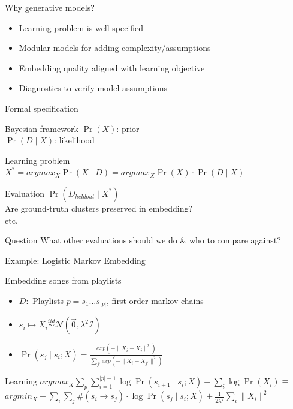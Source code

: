 \documentclass{beamer}
\begin{document}
\begin{frame}{Why generative models?}
  \begin{itemize}
    \item Learning problem is well specified
    \item Modular models for adding complexity/assumptions
    \item Embedding quality aligned with learning objective
    \item Diagnostics to verify model assumptions
  \end{itemize}
\end{frame}

\begin{frame}{Formal specification}
  \begin{block}{Bayesian framework}
    $\Pr(X)$: prior\\
    $\Pr(D \mid X)$: likelihood
  \end{block}
  \begin{block}{Learning problem}
	$X^* = argmax_{ X } \Pr(X \mid D) = argmax_{ X } \Pr(X) \cdot \Pr(D \mid X)$
  \end{block}
  \begin{block}{Evaluation}
	$\Pr(D_{heldout} \mid X^*)$\\
    Are ground-truth clusters preserved in embedding?\\
    etc.
  \end{block}
  \pause
  \begin{alertblock}{Question}
	What other evaluations should we do \& who to compare against?
  \end{alertblock}
\end{frame}

\begin{frame}{Example: Logistic Markov Embedding}
  \begin{block}{Embedding songs from playlists}
  	\begin{itemize}
    		\item $D: $ Playlists $p = s_1 \dots s_{|p|}$, first order markov chains
    		\item $s_i \mapsto X_i \overset{iid}{\sim} \mathcal{N}(\vec{0}, \lambda^2 \mathcal{I})$\\
    		\item $\Pr(s_j \mid s_i ; X) = \frac{exp(-\| X_i - X_j \|^2)}{\sum_{j'} exp(-\| X_i - X_{j'} \|^2)}$
    \end{itemize}
    \end{block}
    \begin{block}{Learning}
    		$argmax_{ X } \sum_p \sum_{i=1}^{|p|-1} \log \Pr(s_{i+1} \mid s_i ; X) + \sum_i \log \Pr(X_i) \equiv$\\
		$argmin_{ X } -\sum_i \sum_j \#(s_i \rightarrow s_j) \cdot \log \Pr(s_j \mid s_i ; X) + \frac{1}{2 \lambda^2} \sum_i \| X_i \|^2$
    \end{block}
\end{frame}
\end{document}
